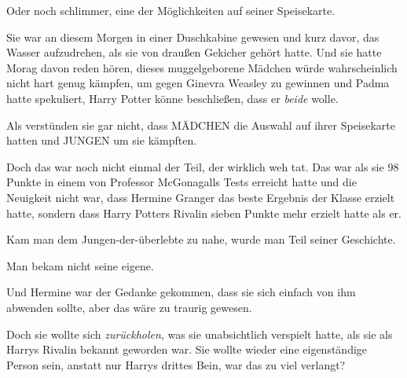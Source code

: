 Oder noch schlimmer, eine der Möglichkeiten auf seiner Speisekarte.

Sie war an diesem Morgen in einer Duschkabine gewesen und kurz davor, das Wasser aufzudrehen, als sie von draußen Gekicher gehört hatte. Und sie hatte Morag davon reden hören, dieses muggelgeborene Mädchen würde wahrscheinlich nicht hart genug kämpfen, um gegen Ginevra Weasley zu gewinnen und Padma hatte spekuliert, Harry Potter könne beschließen, dass er \emph{beide} wolle.

Als verstünden sie gar nicht, dass MÄDCHEN die Auswahl auf ihrer Speisekarte hatten und JUNGEN um sie kämpften.

Doch das war noch nicht einmal der Teil, der wirklich weh tat. Das war als sie 98 Punkte in einem von Professor McGonagalls Tests erreicht hatte und die Neuigkeit nicht war, dass Hermine Granger das beste Ergebnis der Klasse erzielt hatte, sondern dass Harry Potters Rivalin sieben Punkte mehr erzielt hatte als er.

Kam man dem Jungen-der-überlebte zu nahe, wurde man Teil seiner Geschichte.

Man bekam nicht seine eigene.

Und Hermine war der Gedanke gekommen, dass sie sich einfach von ihm abwenden sollte, aber das wäre zu traurig gewesen.

Doch sie wollte sich \emph{zurückholen}, was sie unabsichtlich verspielt hatte, als sie als Harrys Rivalin bekannt geworden war. Sie wollte wieder eine eigenständige Person sein, anstatt nur Harrys drittes Bein, war das zu viel verlangt?

